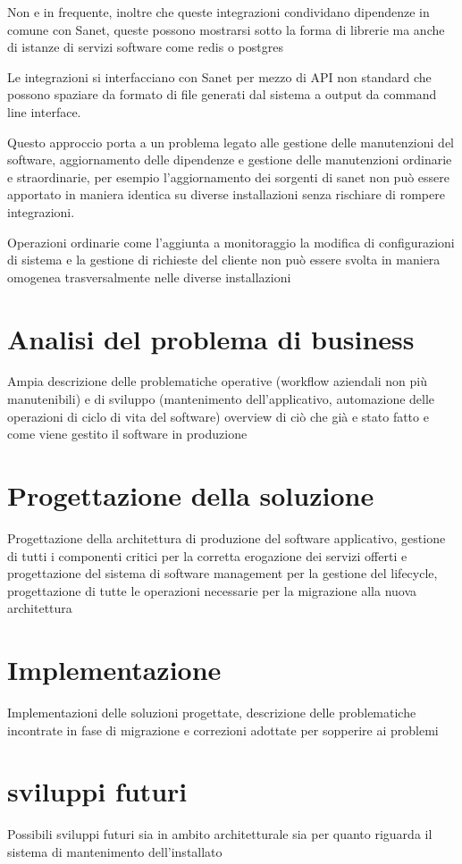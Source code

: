 \documentclass[12pt,a4paper,twoside,openright]{book}
\begin{document}
Non e in frequente, inoltre che queste integrazioni condividano dipendenze in comune con Sanet, queste possono mostrarsi sotto la forma di librerie ma anche di istanze di servizi software come redis o postgres 

Le integrazioni si interfacciano con Sanet per mezzo di API non standard che possono spaziare da formato di file generati dal sistema a output da command line interface.

Questo approccio porta a un problema legato alle gestione delle manutenzioni del software, aggiornamento delle dipendenze e gestione delle manutenzioni ordinarie e straordinarie, per esempio l'aggiornamento dei sorgenti di sanet non può essere apportato in maniera identica su diverse installazioni senza rischiare di rompere integrazioni.

Operazioni ordinarie come l'aggiunta a monitoraggio la modifica di configurazioni di sistema e la gestione di richieste del cliente non può essere svolta in maniera omogenea trasversalmente nelle diverse installazioni

\chapter{Analisi del problema di business}
Ampia descrizione delle problematiche operative (workflow aziendali non più manutenibili) e di sviluppo (mantenimento dell'applicativo, automazione delle operazioni di ciclo di vita del software) overview di ciò che già e stato fatto e come viene gestito il software in produzione

\chapter{Progettazione della soluzione}
Progettazione della architettura di produzione del software applicativo, gestione di tutti i componenti critici per la corretta erogazione dei servizi offerti e progettazione del sistema di software management per la gestione del lifecycle, progettazione di tutte le operazioni necessarie per la migrazione alla nuova architettura

\chapter{Implementazione}
Implementazioni delle soluzioni progettate, descrizione delle problematiche incontrate in fase di migrazione e correzioni adottate per sopperire ai problemi

\chapter{sviluppi futuri}
Possibili sviluppi futuri sia in ambito architetturale sia per quanto riguarda il sistema di mantenimento dell'installato
\end{document}
